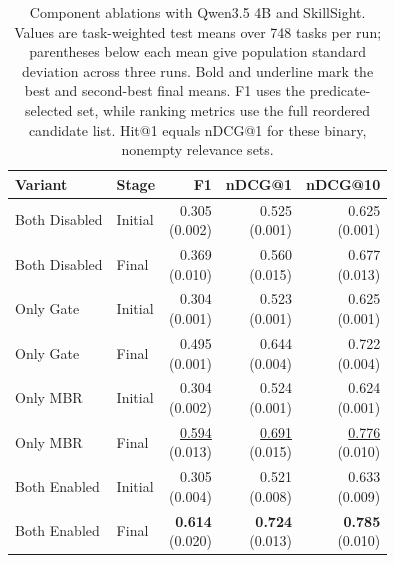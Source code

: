 \begin{table}[t]
\centering
\small
\begin{tabular}{llrrr}
\toprule
Variant & Stage & F1 & nDCG@1 & nDCG@10 \\
\midrule
Both Disabled & Initial & \shortstack{0.305\\(0.002)} & \shortstack{0.525\\(0.001)} & \shortstack{0.625\\(0.001)} \\
Both Disabled & Final & \shortstack{0.369\\(0.010)} & \shortstack{0.560\\(0.015)} & \shortstack{0.677\\(0.013)} \\
Only Gate & Initial & \shortstack{0.304\\(0.001)} & \shortstack{0.523\\(0.001)} & \shortstack{0.625\\(0.001)} \\
Only Gate & Final & \shortstack{0.495\\(0.001)} & \shortstack{0.644\\(0.004)} & \shortstack{0.722\\(0.004)} \\
Only MBR & Initial & \shortstack{0.304\\(0.002)} & \shortstack{0.524\\(0.001)} & \shortstack{0.624\\(0.001)} \\
Only MBR & Final & \shortstack{\underline{0.594}\\(0.013)} & \shortstack{\underline{0.691}\\(0.015)} & \shortstack{\underline{0.776}\\(0.010)} \\
Both Enabled & Initial & \shortstack{0.305\\(0.004)} & \shortstack{0.521\\(0.008)} & \shortstack{0.633\\(0.009)} \\
Both Enabled & Final & \shortstack{\textbf{0.614}\\(0.020)} & \shortstack{\textbf{0.724}\\(0.013)} & \shortstack{\textbf{0.785}\\(0.010)} \\
\bottomrule
\end{tabular}
\caption{Component ablations with Qwen3.5 4B and SkillSight. Values are task-weighted test means over 748 tasks per run; parentheses below each mean give population standard deviation across three runs. Bold and underline mark the best and second-best final means. F1 uses the predicate-selected set, while ranking metrics use the full reordered candidate list. Hit@1 equals nDCG@1 for these binary, nonempty relevance sets.}
\label{tab:app-ablation-endpoints}
\end{table}

